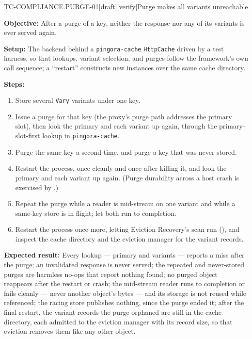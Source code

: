 \begin{requirement}{TC-COMPLIANCE.PURGE-01}[draft][verify]{Purge makes all variants unreachable}


  \textbf{Objective:} After a purge of a key, neither the response nor any of its
  variants is ever served again.

  \textbf{Setup:} The backend behind a \texttt{pingora-cache}
  \texttt{HttpCache} driven by a test harness, so that lookups, variant
  selection, and purges follow the framework's own call sequence; a
  ``restart'' constructs new instances over the same cache directory.

  \textbf{Steps:}
  \begin{enumerate}
    \item Store several \texttt{Vary} variants under one key.
    \item Issue a purge for that key (the proxy's purge path addresses the primary
      slot), then look the primary and each variant up again, through
      the primary-slot-first lookup in \texttt{pingora-cache}.
    \item Purge the same key a second time, and purge a key that was never
      stored.
    \item Restart the process, once cleanly and once after killing it, and
      look the primary and each variant up again. (Purge durability across a
      host crash is exercised by .)
    \item Repeat the purge while a reader is mid-stream on one variant and
      while a same-key store is in flight; let both run to completion.
    \item Restart the process once more, letting Eviction Recovery's scan run
      (), and inspect the cache directory and
      the eviction manager for the variant records.
  \end{enumerate}

  \textbf{Expected result:} Every lookup --- primary and variants --- reports a
  miss after the purge; an invalidated response is never served; the repeated
  and never-stored purges are harmless no-ops that report nothing found; no
  purged object reappears after the restart or crash; the mid-stream reader
  runs to completion or fails cleanly --- never another object's bytes --- and
  its storage is not reused while referenced; the racing store publishes
  nothing, since the purge ended it; after the final restart, the variant
  records the purge orphaned are still in the cache directory, each admitted
  to the eviction manager with its record size, so that eviction removes them
  like any other object.


\end{requirement}
